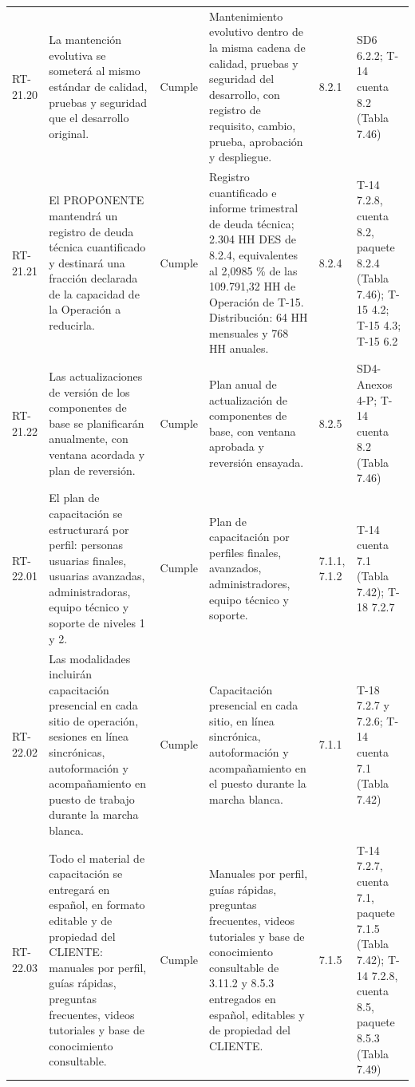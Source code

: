 \documentclass[carta,firma,final]{lafrox}
\begin{document}
\begin{landscape}
{\begin{longtable}{@{}F{0.070} F{0.255} F{0.075} F{0.280} F{0.090} F{0.230}@{}}
  RT-21.20 & La mantención evolutiva se someterá al mismo estándar de calidad, pruebas y seguridad que el desarrollo original. & Cumple & Mantenimiento evolutivo dentro de la misma cadena de calidad, pruebas y seguridad del desarrollo, con registro de requisito, cambio, prueba, aprobación y despliegue. & 8.2.1 & SD6 6.2.2; T-14 cuenta 8.2 (Tabla 7.46) \\
  RT-21.21 & El PROPONENTE mantendrá un registro de deuda técnica cuantificado y destinará una fracción declarada de la capacidad de la Operación a reducirla. & Cumple & Registro cuantificado e informe trimestral de deuda técnica; 2.304 HH DES de 8.2.4, equivalentes al 2,0985 \% de las 109.791,32 HH de Operación de T-15. Distribución: 64 HH mensuales y 768 HH anuales. & 8.2.4 & T-14 7.2.8, cuenta 8.2, paquete 8.2.4 (Tabla 7.46); T-15 4.2; T-15 4.3; T-15 6.2 \\
  RT-21.22 & Las actualizaciones de versión de los componentes de base se planificarán anualmente, con ventana acordada y plan de reversión. & Cumple & Plan anual de actualización de componentes de base, con ventana aprobada y reversión ensayada. & 8.2.5 & SD4-Anexos 4-P; T-14 cuenta 8.2 (Tabla 7.46) \\
  RT-22.01 & El plan de capacitación se estructurará por perfil: personas usuarias finales, usuarias avanzadas, administradoras, equipo técnico y soporte de niveles 1 y 2. & Cumple & Plan de capacitación por perfiles finales, avanzados, administradores, equipo técnico y soporte. & 7.1.1, 7.1.2 & T-14 cuenta 7.1 (Tabla 7.42); T-18 7.2.7 \\
  RT-22.02 & Las modalidades incluirán capacitación presencial en cada sitio de operación, sesiones en línea sincrónicas, autoformación y acompañamiento en puesto de trabajo durante la marcha blanca. & Cumple & Capacitación presencial en cada sitio, en línea sincrónica, autoformación y acompañamiento en el puesto durante la marcha blanca. & 7.1.1 & T-18 7.2.7 y 7.2.6; T-14 cuenta 7.1 (Tabla 7.42) \\
  RT-22.03 & Todo el material de capacitación se entregará en español, en formato editable y de propiedad del CLIENTE: manuales por perfil, guías rápidas, preguntas frecuentes, videos tutoriales y base de conocimiento consultable. & Cumple & Manuales por perfil, guías rápidas, preguntas frecuentes, videos tutoriales y base de conocimiento consultable de 3.11.2 y 8.5.3 entregados en español, editables y de propiedad del CLIENTE. & 7.1.5 & T-14 7.2.7, cuenta 7.1, paquete 7.1.5 (Tabla 7.42); T-14 7.2.8, cuenta 8.5, paquete 8.5.3 (Tabla 7.49) \\

\end{longtable}}
\end{landscape}
\end{document}
